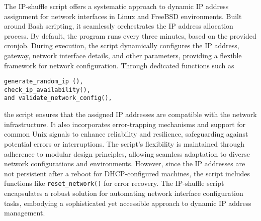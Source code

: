 The IP-shuffle script offers a systematic approach to dynamic IP address assignment for network interfaces in Linux and FreeBSD environments. Built around Bash scripting, it seamlessly orchestrates the IP address allocation process. By default, the program runs every three minutes, based on the provided cronjob. During execution, the script dynamically configures the IP address, gateway, network interface details, and other parameters, providing a flexible framework for network configuration. Through dedicated functions such as
\begin{verbatim}
generate_random_ip (), 
check_ip_availability(), 
and validate_network_config(), 
\end{verbatim}
the script ensures that the assigned IP addresses are compatible with the network infrastructure. It also incorporates error-trapping mechanisms and support for common Unix signals to enhance reliability and resilience, safeguarding against potential errors or interruptions. The script's flexibility is maintained through adherence to modular design principles, allowing seamless adaptation to diverse network configurations and environments. However, since the IP addresses are not persistent after a reboot for DHCP-configured machines, the script includes functions like \texttt{reset\_network()} for error recovery. The IP-shuffle script encapsulates a robust solution for automating network interface configuration tasks, embodying a sophisticated yet accessible approach to dynamic IP address management.
 